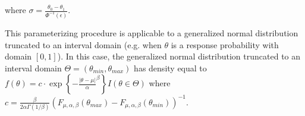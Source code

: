 \documentclass[useAMS,usenatbib,referee]{biom}
\begin{document}
where $\sigma=\frac{\theta_0-\theta_1}{\Phi^{-1}(\epsilon)}$.
%

This parameterizing procedure is applicable to a generalized normal distribution truncated to an interval domain (e.g. when $\theta$ is a response probability with domain $[0,1]$). In this case, the generalized normal distribution truncated to an interval domain $\Theta=(\theta_{min},\theta_{max})$ has density equal to $f(\theta)=c\cdot\exp\left\{-\frac{|\theta-\mu|}{\alpha}^{\beta}\right\}{I(\theta\in \Theta)}$ where $c=\frac{\beta}{2\alpha \Gamma(1/\beta)}({F_{\mu,\alpha,\beta}(\theta_{max})-F_{\mu,\alpha,\beta}(\theta_{min})})^{-1}$.
\end{document}
